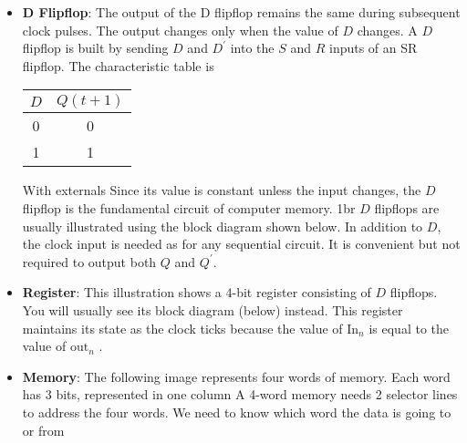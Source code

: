 \documentclass{report}
\begin{document}
\begin{itemize}
            \item \textbf{D Flipflop}: The output of the D flipflop remains the same during subsequent clock pulses. The output changes only when the value of $D$ changes.
                \bigbreak \noindent 
                A $D$ flipflop is built by sending $D$ and $D^{\prime}$ into the $S$ and $R$ inputs of an SR flipflop.
                \bigbreak \noindent 
                The characteristic table is 
                \bigbreak \noindent 
                \begin{center}
                    \begin{tabular}{c|c}
                         $D$&$Q(t+1)$ \\ 
                        \hline
                         0 & 0 \\ 
                         1 & 1
                    \end{tabular}
                \end{center}
                \bigbreak \noindent 
                With externals
                \bigbreak \noindent 
                \bigbreak \noindent 
                Since its value is constant unless the input changes, the $D$ flipflop is the fundamental circuit of computer memory.
                1br
                $D$ flipflops are usually illustrated using the block diagram shown below.
                \bigbreak \noindent 
                 In addition to $D$, the clock input is needed as for any sequential circuit.
                 \bigbreak \noindent 
                 It is convenient but not required to output both $Q$ and $Q^{\prime} $.
                 \bigbreak \noindent 
            \item \textbf{Register}: This illustration shows a 4-bit register consisting of $D$ flipflops. You will usually see its block diagram (below) instead.
                \bigbreak \noindent 
                \bigbreak \noindent 
                \bigbreak \noindent 
                This register maintains its state as the clock ticks because the value of $\text{In}_{n}$ is equal to the value of $\text{out}_{n}$ .
            \item \textbf{Memory}: The following image represents four words of memory. Each word has 3 bits, represented in one column
                \bigbreak \noindent 
                A 4-word memory needs 2 selector lines to address the four words. We need to know which word the data is going to or from

\end{itemize}
\end{document}

